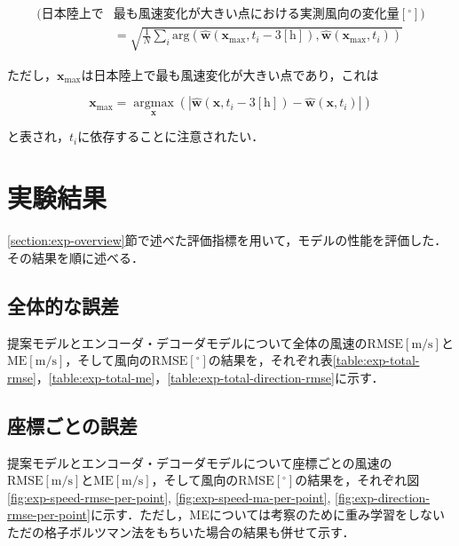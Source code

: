\begin{equation}
  \begin{split}
    (\mathrm{日本陸上で}&\mathrm{最も風速変化が大きい点における実測風向の変化量 [^\circ]}) \\
    & = \sqrt{\frac{1}{N} \sum_{i} \mathrm{arg}(\hat{\bm{w}}(\bm{x}_{\mathrm{max}}, t_i - 3\mathrm{[h]}), \hat{\bm{w}}(\bm{x}_{\mathrm{max}}, t_i))}
  \end{split}
  \label{eq:exp-direction-diff-at-max-diff-point}
\end{equation}

ただし，$\bm{x}_{\mathrm{max}}$は日本陸上で最も風速変化が大きい点であり，これは

\begin{equation}
  \bm{x}_{\mathrm{max}} = \underset{\bm{x}} {\operatorname{argmax}} \left(|\hat{\bm{w}}(\bm{x}, t_i - 3\mathrm{[h]}) - \hat{\bm{w}}(\bm{x}, t_i)| \right)
  \label{eq:exp-max-diff-point}
\end{equation}

と表され，$t_i$に依存することに注意されたい．

\section{実験結果 \label{section:exp-results}}
\ref{section:exp-overview}節で述べた評価指標を用いて，モデルの性能を評価した．その結果を順に述べる．

\subsection{全体的な誤差 \label{subsection:exp-results-total}}
提案モデルとエンコーダ・デコーダモデルについて全体の風速の$\mathrm{RMSE[m/s]}$と$\mathrm{ME[m/s]}$，そして風向の$\mathrm{RMSE[^\circ]}$の結果を，それぞれ表\ref{table:exp-total-rmse}，\ref{table:exp-total-me}，\ref{table:exp-total-direction-rmse}に示す．

\subsection{座標ごとの誤差 \label{subsection:exp-results-per-point}}
提案モデルとエンコーダ・デコーダモデルについて座標ごとの風速の$\mathrm{RMSE[m/s]}$と$\mathrm{ME[m/s]}$，そして風向の$\mathrm{RMSE[^\circ]}$の結果を，それぞれ図\ref{fig:exp-speed-rmse-per-point}, \ref{fig:exp-speed-ma-per-point}, \ref{fig:exp-direction-rmse-per-point}に示す．ただし，MEについては考察のために重み学習をしないただの格子ボルツマン法をもちいた場合の結果も併せて示す．

